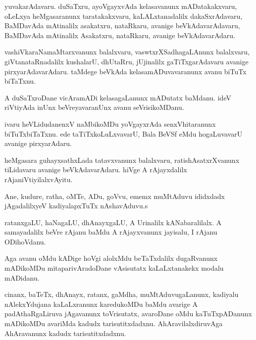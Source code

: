 \documentclass{article}
\begin{document}
\begin{mn}
yuvakarAdavaru.  duSaTxru,  ayoVgayxvAda  kelasavanunx  mADatakakxvaru,  oLeLxya  heMgasaranunx  taratakakxvaru,  
kaLALxtanadalilx  dakaSxrAdavaru,  BaMDavAda  mAtinalilx  asakatxru,  nataRkaru,  avanige  beVkAdavarAdavaru,  
BaMDavAda  mAtinalilx  Asakatxru,  nataRkaru,  avanige  beVkAdavarAdaru.
\end{mn}

\begin{mn}
vashiVkaraNamaMtarxvanunx  balalxvaru,  vaswtxrXSadhagaLAnunx  balalxvaru,  giVtanataRnadalilx  kushalarU,  dhUtaRru,  
jUjinalilx  gaTiTxgarAdavaru  avanige  pirxyarAdavarAdaru.  taMdege  beVkAda  kelasamADuvavaranunx  avanu  biTuTx  biTaTxnu.
\end{mn}

\begin{mn}
A  duSaTxroDane  vicAramADi  kelasagaLanunx  mADutatx  baMdanu.  ideV  riVtiyAda  inUnx  beVreyavaranUnx  avanu  seVrisikoMDanu.
\end{mn}

\begin{mn}
ivaru  heVLidudanenxV  naMbikoMDu  yoVgayxrAda  senxVhitaranunx  biTuTxbiTaTxnu.  ede  taTiTxkoLuLxvavarU,  
Bala  BeVSf  eMdu  hogaLuvavarU  avanige  pirxyarAdaru.
\end{mn}

\begin{mn}
heMgasara  guhayxsathxLada  tatavxvanunx  balalxvaru,  ratishAsatxrXvanunx  tiLidavaru  avanige  
beVkAdavarAdaru.  hiVge  A  rAjayxdalilx  rAjaniVtiyilalxvAyitu.
\end{mn}

\begin{mn}
Ane,  kudure,  ratha,  oMTe,  ADu,  goVvu,  ememx  muMtAduvu  ididxdadx  jAgadalilxyeV  kadiyalapxTuTx  nAshavAduvu.s
\end{mn}

\begin{mn}
ratanxgaLU,  haNagaLU,  dhAnayxgaLU,  A  Urinalilx  kANabaralilalx.  A  samayadalilx  beVre  rAjanu  baMdu  
A  rAjayxvanunx  jayisalu,  I  rAjanu  ODihoVdanu.
\end{mn}

\begin{mn}
Aga  avanu  oMdu  kADige  hoVgi  alolxMdu  beTaTxdalilx  dugaRvanunx  mADikoMDu  mitaparivAradoDane  vAsisutatx  
kaLaLxtanakekx  modalu  mADidanu.
\end{mn}

\begin{mn}
cinanx,  baTeTx,  dhAnayx,  ratanx,  gaMdha,  muMtAduvugaLanunx,  kadiyalu  nAlekxYdujana  kaLaLxranunx  karedukoMDu  
baMdu  avarige  A  padAthaRgaLiruva  jAgavanunx  toVrisutatx,  avaroDane  oMdu  kaTuTxpADanunx  mADikoMDu  avariMda  
kadudx  tarisutitxdadxnu.  AhAravilalxdiruvAga  AhAravanunx  kadudx  tarisutitxdadxnu.  
\end{mn}
\end{document}
